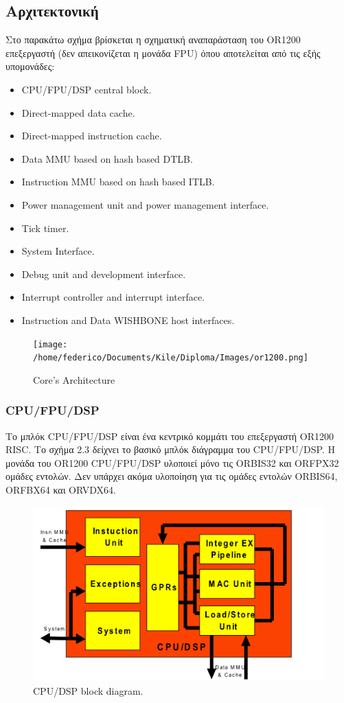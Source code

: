 \documentclass[a4paper,10pt]{article}
\numberwithin{figure}{section}
\numberwithin{table}{section}
\begin{document}
\subsection{Αρχιτεκτονική}
Στο παρακάτω σχήμα βρίσκεται η σχηματική αναπαράσταση του OR1200 επεξεργαστή (δεν απεικονίζεται η μονάδα FPU) 
όπου αποτελείται από τις εξής υπομονάδες:
\begin{itemize}
 \item CPU/FPU/DSP central block.
 \item Direct-mapped data cache.
 \item Direct-mapped instruction cache.
 \item Data MMU based on hash based DTLB.
 \item Instruction MMU based on hash based ITLB.
 \item Power management unit and power management interface.
 \item Tick timer.
 \item System Interface.
 \item Debug unit and development interface.
 \item Interrupt controller and interrupt interface.
 \item Instruction and Data WISHBONE host interfaces.
\end{itemize}
\begin{figure}[h!]
 \centering
 \texttt{[image: /home/federico/Documents/Kile/Diploma/Images/or1200.png]}
 \caption{Core's Architecture}
\end{figure}

\subsubsection{CPU/FPU/DSP}
Το μπλόκ CPU/FPU/DSP είναι ένα κεντρικό κομμάτι του επεξεργαστή OR1200 RISC. Το σχήμα 2.3 δείχνει
το βασικό μπλόκ διάγραμμα του CPU/FPU/DSP. Η μονάδα του OR1200 CPU/FPU/DSP
υλοποιεί μόνο τις ORBIS32 και ORFPX32 ομάδες εντολών. Δεν υπάρχει ακόμα υλοποίηση για τις
ομάδες εντολών ORBIS64, ORFBX64 και ORVDX64.

\vspace{0.7cm}
\begin{figure}[h!]
 \centering
 \includegraphics[bb=0 0 1020 613,scale=0.35]{./Images/cpu-dsp.png}
 \caption{CPU/DSP block diagram.}
\end{figure}
\end{document}
